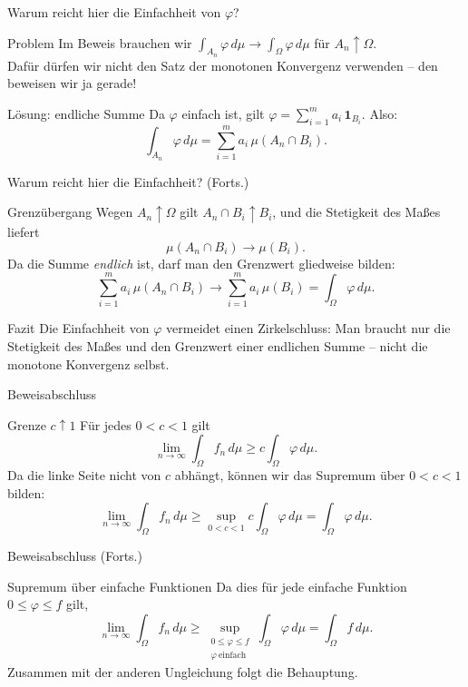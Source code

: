 \documentclass{beamer}
\begin{document}
\begin{frame}{Warum reicht hier die Einfachheit von \(\varphi\)?}
\begin{block}{Problem}
Im Beweis brauchen wir \(\int_{A_n}\varphi\,d\mu\to\int_\Omega\varphi\,d\mu\) für \(A_n\uparrow\Omega\).
\\[4pt]
Dafür dürfen wir nicht den Satz der monotonen Konvergenz verwenden -- den beweisen wir ja gerade!
\end{block}

\begin{block}{Lösung: endliche Summe}
Da \(\varphi\) einfach ist, gilt \(\varphi=\sum_{i=1}^m a_i\,\mathbf 1_{B_i}\). Also:
\[
\int_{A_n}\varphi\,d\mu
=\sum_{i=1}^m a_i\,\mu(A_n\cap B_i).
\]
\end{block}
\end{frame}

\begin{frame}{Warum reicht hier die Einfachheit? (Forts.)}
\begin{block}{Grenzübergang}
Wegen \(A_n\uparrow\Omega\) gilt \(A_n\cap B_i\uparrow B_i\), und die Stetigkeit des Maßes liefert
\[
\mu(A_n\cap B_i)\to\mu(B_i).
\]
Da die Summe \emph{endlich} ist, darf man den Grenzwert gliedweise bilden:
\[
\sum_{i=1}^m a_i\,\mu(A_n\cap B_i)\to\sum_{i=1}^m a_i\,\mu(B_i)=\int_\Omega\varphi\,d\mu.
\]
\end{block}

\begin{block}{Fazit}
Die Einfachheit von \(\varphi\) vermeidet einen Zirkelschluss: Man braucht nur die Stetigkeit des Maßes und den Grenzwert einer endlichen Summe -- nicht die monotone Konvergenz selbst.
\end{block}
\end{frame}

\begin{frame}{Beweisabschluss}
\begin{block}{Grenze \(c\uparrow 1\)}
Für jedes \(0<c<1\) gilt
\[
\lim_{n\to\infty}\int_\Omega f_n\,d\mu
\ge
c\int_\Omega \varphi\,d\mu.
\]
Da die linke Seite nicht von \(c\) abhängt, können wir das Supremum über \(0<c<1\) bilden:
\[
\lim_{n\to\infty}\int_\Omega f_n\,d\mu
\ge
\sup_{0<c<1} c\int_\Omega \varphi\,d\mu
=
\int_\Omega \varphi\,d\mu.
\]
\end{block}
\end{frame}

\begin{frame}{Beweisabschluss (Forts.)}
\begin{block}{Supremum über einfache Funktionen}
Da dies für jede einfache Funktion \(0\le\varphi\le f\) gilt,
\[
\lim_{n\to\infty}\int_\Omega f_n\,d\mu
\ge
\sup_{\substack{0\le\varphi\le f\\ \varphi\ \text{einfach}}}
\int_\Omega \varphi\,d\mu
=
\int_\Omega f\,d\mu.
\]
Zusammen mit der anderen Ungleichung folgt die Behauptung.
\end{block}
\end{frame}
\end{document}
